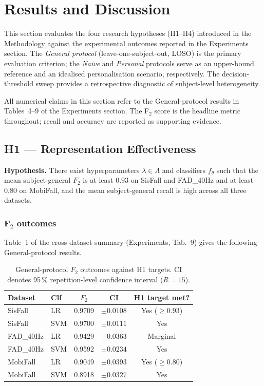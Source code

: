 \chapter{Results and Discussion}
\label{sec:results}

This section evaluates the four research hypotheses (H1--H4) introduced in the
Methodology against the experimental outcomes reported in the Experiments section.
The \emph{General protocol} (leave-one-subject-out, LOSO) is the primary evaluation
criterion; the \emph{Naive} and \emph{Personal} protocols serve as an upper-bound
reference and an idealised personalisation scenario, respectively.  The
decision-threshold sweep provides a retrospective diagnostic of subject-level
heterogeneity.

All numerical claims in this section refer to the General-protocol results in
Tables~4--9 of the Experiments section.  The F$_2$ score is the headline metric
throughout; recall and accuracy are reported as supporting evidence.

\section{H1 — Representation Effectiveness}
\label{subsec:H1}

\textbf{Hypothesis.} There exist hyperparameters $\lambda\in\Lambda$ and classifiers
$f_\theta$ such that the mean subject-general $F_2$ is at least $0.93$ on SisFall and
FAD\_40Hz and at least $0.80$ on MobiFall, and the mean subject-general recall is high
across all three datasets.

\subsection{F$_2$ outcomes}

Table~1 of the cross-dataset summary (Experiments, Tab.~9) gives the following
General-protocol results.

\begin{table}[h!]
\centering
\caption{General-protocol $F_2$ outcomes against H1 targets.  CI denotes
  95\,\% repetition-level confidence interval ($R=15$).}
\label{tab:H1-summary}
\small
\begin{tabular}{llccc}
\toprule
\textbf{Dataset} & \textbf{Clf} & \textbf{$F_2$} & \textbf{CI} & \textbf{H1 target met?} \\
\midrule
SisFall   & LR  & 0.9709 & $\pm0.0108$ & Yes ($\geq0.93$) \\
SisFall   & SVM & 0.9700 & $\pm0.0111$ & Yes              \\
FAD\_40Hz & LR  & 0.9429 & $\pm0.0363$ & Marginal         \\
FAD\_40Hz & SVM & 0.9592 & $\pm0.0234$ & Yes              \\
MobiFall  & LR  & 0.9049 & $\pm0.0393$ & Yes ($\geq0.80$) \\
MobiFall  & SVM & 0.8918 & $\pm0.0327$ & Yes              \\
\bottomrule
\end{tabular}
\end{table}


